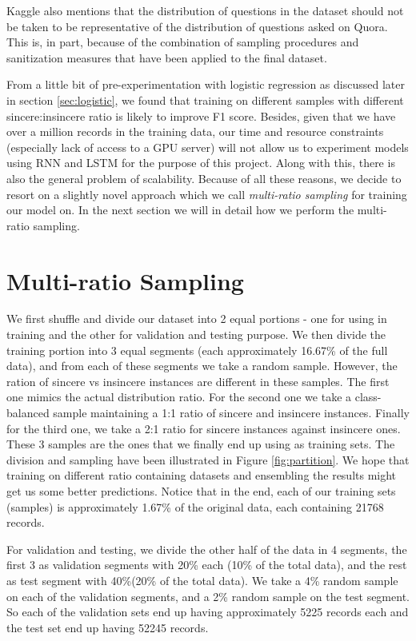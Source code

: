 \documentclass[11pt,twocolumn,letterpaper]{article}
\begin{document}
Kaggle also mentions that the distribution of questions in the dataset should not be taken to be representative of the distribution of questions asked on Quora. This is, in part, because of the combination of sampling procedures and sanitization measures that have been applied to the final dataset.

From a little bit of pre-experimentation with logistic regression as discussed later in section \ref{sec:logistic}, we found that training on different samples with different sincere:insincere ratio is likely to improve F1 score.
Besides, given that we have over a million records in the training data, our time and resource constraints (especially lack of access to a GPU server) will not allow us to experiment models using RNN and LSTM for the purpose of this project. Along with this, there is also the general problem of scalability. Because of all these reasons,  we decide to resort on a slightly novel approach which we call \textit{multi-ratio sampling} for training our model on. In the next section we will in detail how we perform the multi-ratio sampling.

\section{Multi-ratio Sampling} \label{muti_ratio}

We first shuffle and divide our dataset into 2 equal portions - one for using in training and the other for validation and testing purpose. We then divide the training portion into 3 equal segments (each approximately 16.67\% of the full data), and from each of these segments we take a random sample. However, the ration of sincere vs insincere instances are different in these  samples. The first one mimics the actual distribution ratio. For the second one we take a class-balanced sample maintaining a 1:1 ratio of sincere and insincere instances. Finally for the third one, we take a 2:1 ratio for sincere instances against insincere ones. These 3 samples are the ones that we finally end up using as training sets. The division and sampling have been illustrated in Figure \ref{fig:partition}. We hope that training on different ratio containing datasets and ensembling the results might get us some better predictions. Notice that in the end, each of our training sets (samples) is approximately 1.67\% of the original data, each containing 21768 records.

For validation and testing, we divide the other half of the data in 4 segments, the first 3 as validation segments with 20\% each (10\% of the total data), and the rest as test segment with 40\%(20\% of the total data). We take a 4\% random sample on each of the validation segments, and a 2\% random sample on the test segment. So each of the validation sets end up having approximately 5225 records each and the test set end up having 52245 records.
\end{document}
